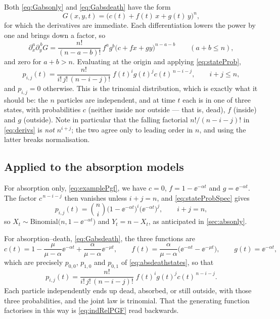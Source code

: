 Both \cref{eq:Gabsonly} and \cref{eq:Gabsdeath} have the form
\begin{equation}
\label{eq:multilinear}
G(x,y,t) = \bigl(c(t) + f(t)\,x + g(t)\,y\bigr)^n ,
\end{equation}
for which the derivatives are immediate. Each differentiation lowers the power by
one and brings down a factor, so
\begin{equation}
\label{eq:derivs}
\partial_x^{a}\partial_y^{\,b}G
= \frac{n!}{(n-a-b)!}\,f^{a}g^{b}\bigl(c+fx+gy\bigr)^{n-a-b}
\qquad(a+b\le n),
\end{equation}
and zero for $a+b>n$. Evaluating at the origin and applying \cref{eq:stateProb},
\begin{equation}
\label{eq:stateProbSpec}
p_{i,j}(t) = \frac{n!}{i!\,j!\,(n-i-j)!}\;f(t)^{i}g(t)^{j}c(t)^{\,n-i-j},
\qquad i+j\le n,
\end{equation}
and $p_{i,j}=0$ otherwise. This is the trinomial distribution, which is exactly
what it should be: the $n$ particles are independent, and at time $t$ each is in
one of three states, with probabilities $c$ (neither inside nor outside --- that
is, dead), $f$ (inside) and $g$ (outside). Note in particular that the falling
factorial $n!/(n-i-j)!$ in \cref{eq:derivs} is \emph{not} $n^{i+j}$; the two agree
only to leading order in $n$, and using the latter breaks normalisation.

\subsection*{Applied to the absorption models}

For absorption only, \cref{eq:examplePgf}, we have $c=0$, $f = 1-\ee^{-\alpha t}$
and $g = \ee^{-\alpha t}$. The factor $c^{\,n-i-j}$ then vanishes unless $i+j=n$,
and \cref{eq:stateProbSpec} gives
\begin{equation*}
p_{i,j}(t) = \binom{n}{i}\bigl(1-\ee^{-\alpha t}\bigr)^{i}\bigl(\ee^{-\alpha t}\bigr)^{j},
\qquad i+j=n,
\end{equation*}
so $X_t\sim\text{Binomial}\bigl(n,1-\ee^{-\alpha t}\bigr)$ and $Y_t = n-X_t$, as
anticipated in \cref{sec:absonly}.

For absorption--death, \cref{eq:Gabsdeath}, the three functions are
\begin{equation*}
c(t) = 1-\frac{\mu}{\mu-\alpha}\ee^{-\alpha t} + \frac{\alpha}{\mu-\alpha}\ee^{-\mu t},
\qquad
f(t) = \frac{\alpha}{\mu-\alpha}\bigl(\ee^{-\alpha t}-\ee^{-\mu t}\bigr),
\qquad
g(t) = \ee^{-\alpha t},
\end{equation*}
which are precisely $p_{0,0}$, $p_{1,0}$ and $p_{0,1}$ of
\cref{eq:absdeathstates}, so that
\begin{equation*}
p_{i,j}(t) = \frac{n!}{i!\,j!\,(n-i-j)!}\;f(t)^{i}g(t)^{j}c(t)^{\,n-i-j} .
\end{equation*}
Each particle independently ends up dead, absorbed, or still outside, with those
three probabilities, and the joint law is trinomial. That the generating function
factorises in this way is \cref{eq:indRelPGF} read backwards.

